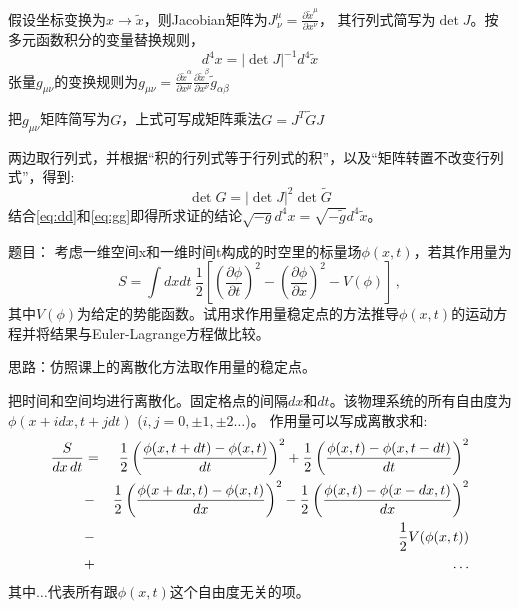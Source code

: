 \documentclass[CJK]{beamer}
\begin{document}
\begin{frame}
\bch
假设坐标变换为$x \rightarrow \tilde{x}$，则Jacobian矩阵为$J^\mu_{\,\nu} = \frac{\partial \tilde{x}^\mu}{\partial x^\nu}$， 其行列式简写为$\det{J}$。按多元函数积分的变量替换规则，
\begin{equation}
 d^4x = |\det{J}|^{-1} d^4\tilde{x} \label{eq:dd}
\end{equation}
张量$g_{\mu\nu}$的变换规则为$ g_{\mu\nu} =  \frac{\partial \tilde{x}^\alpha}{\partial x^\mu} \frac{\partial \tilde{x}^\beta}{\partial x^\nu} \tilde{g}_{\alpha\beta} $

把$g_{\mu\nu}$矩阵简写为$G$，上式可写成矩阵乘法$ G = J^T \tilde{G} J$

两边取行列式，并根据“积的行列式等于行列式的积”，以及“矩阵转置不改变行列式”，得到:
\begin{equation}
\det{G} = |\det{J}|^2 \det{\tilde{G}} \label{eq:gg}
\end{equation}
结合\eqref{eq:dd}和\eqref{eq:gg}即得所求证的结论$\sqrt{-g}d^4x = \sqrt{-\tilde{g}}d^4\tilde{x}$。

\ech
\end{frame}



\begin{frame}
\bch
题目： 考虑一维空间x和一维时间t构成的时空里的标量场$\phi(x,t)$，若其作用量为
$$ S = \int dx dt \   \frac{1}{2} \left[\left(\frac{\partial \phi}{\partial t}\right)^2 - \left(\frac{\partial \phi}{\partial x}\right)^2 - V(\phi)\right]\, ,$$
其中$V(\phi)$为给定的势能函数。试用求作用量稳定点的方法推导$\phi(x, t)$的运动方程并将结果与Euler-Lagrange方程做比较。

\skipline
思路：仿照课上的离散化方法取作用量的稳定点。
\ech
\end{frame}

\begin{frame}
\bch
把时间和空间均进行离散化。固定格点的间隔$dx$和$dt$。该物理系统的所有自由度为$\phi(x+idx, t+j dt)$ ($i, j = 0, \pm 1, \pm 2\ldots$)。
作用量可以写成离散求和:
\begin{eqnarray}
\frac{S}{dx\,dt} &=& \frac{1}{2}\left(\frac{\phi(x, t+dt) - \phi(x,t)}{dt}\right)^2 + \frac{1}{2}\left(\frac{\phi(x, t) - \phi(x,t-dt)}{dt}\right)^2 \nonumber \\
 &-&\frac{1}{2}\left(\frac{\phi(x+dx, t) - \phi(x,t)}{dx}\right)^2 - \frac{1}{2}\left(\frac{\phi(x, t) - \phi(x-dx,t)}{dx}\right)^2 \nonumber \\
 &-&\frac{1}{2}V(\phi(x, t)) \nonumber \\
 &+&\ldots \nonumber
\end{eqnarray}
其中$\ldots$代表所有跟$\phi(x, t)$这个自由度无关的项。
\ech
\end{frame}
\end{document}

